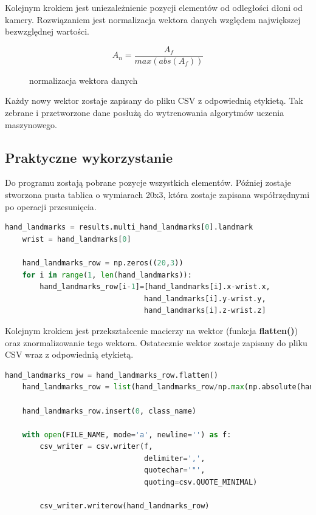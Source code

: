 \quad Kolejnym krokiem jest uniezależnienie pozycji elementów od odległości dłoni od kamery. Rozwiązaniem jest normalizacja wektora danych względem największej bezwzględnej wartości. 

\begin{figure}[H]
\begin{equation}
    A_n=\dfrac{A_f}{max(abs(A_f))}
\end{equation}
\caption{normalizacja wektora danych}
\end{figure}

\quad Każdy nowy wektor zostaje zapisany do pliku CSV z odpowiednią etykietą. Tak zebrane i przetworzone dane posłużą do wytrenowania algorytmów uczenia maszynowego.

\newpage
\subsection{Praktyczne wykorzystanie}

\quad Do programu zostają pobrane pozycje wszystkich elementów. Później zostaje stworzona pusta tablica o wymiarach 20x3, która zostaje zapisana współrzędnymi po operacji przesunięcia. \newline

\begin{lstlisting}[language=python, style=programming, captionpos=b, caption={Funkcja zwracająca rozpoznany gest}]
    hand_landmarks = results.multi_hand_landmarks[0].landmark
    wrist = hand_landmarks[0]

    hand_landmarks_row = np.zeros((20,3))
    for i in range(1, len(hand_landmarks)):
        hand_landmarks_row[i-1]=[hand_landmarks[i].x-wrist.x, 
                                hand_landmarks[i].y-wrist.y, 
                                hand_landmarks[i].z-wrist.z]
\end{lstlisting}

\quad Kolejnym krokiem jest przekształcenie macierzy na wektor (funkcja \textbf{flatten()}) oraz znormalizowanie tego wektora. Ostatecznie wektor zostaje zapisany do pliku CSV wraz z odpowiednią etykietą. \newline

\begin{lstlisting}[language=python, style=programming, captionpos=b, caption={Funkcja zwracająca rozpoznany gest}]
    hand_landmarks_row = hand_landmarks_row.flatten()
    hand_landmarks_row = list(hand_landmarks_row/np.max(np.absolute(hand_landmarks_row)))
    
    hand_landmarks_row.insert(0, class_name)
    
    with open(FILE_NAME, mode='a', newline='') as f:
        csv_writer = csv.writer(f, 
                                delimiter=',', 
                                quotechar='"', 
                                quoting=csv.QUOTE_MINIMAL)

        csv_writer.writerow(hand_landmarks_row)
\end{lstlisting}

